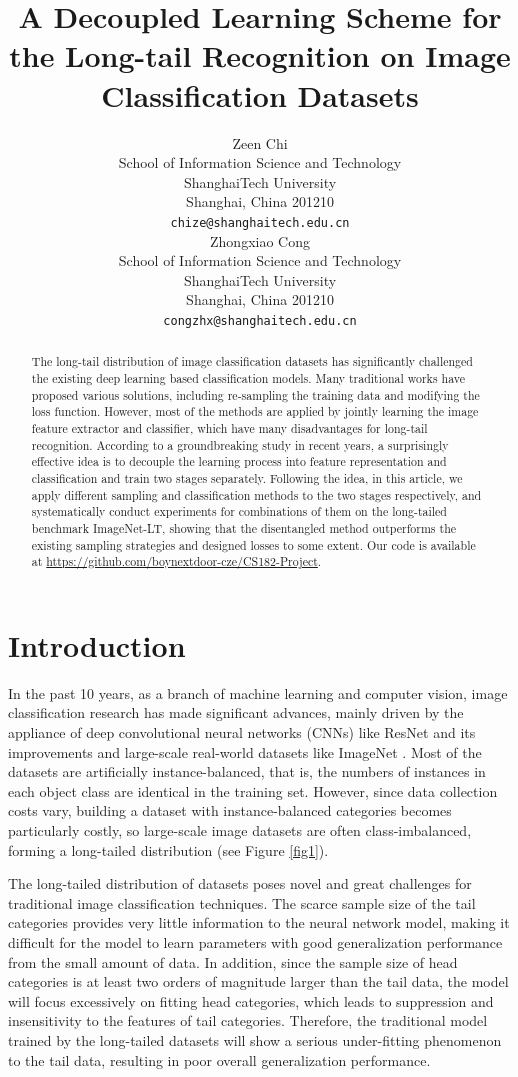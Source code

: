 \documentclass{article}
\title{A Decoupled Learning Scheme for the Long-tail Recognition on Image Classification Datasets}
\author{
  Zeen Chi \\
  School of Information Science and Technology\\
  ShanghaiTech University\\
  Shanghai, China 201210 \\
  \texttt{chize@shanghaitech.edu.cn} \\
  \And
  Zhongxiao Cong \\
  School of Information Science and Technology \\
  ShanghaiTech University\\
  Shanghai, China 201210 \\
  \texttt{congzhx@shanghaitech.edu.cn} \\
}
\begin{document}
\maketitle


\begin{abstract}
    The long-tail distribution of image classification datasets has significantly challenged the existing deep learning based classification models. Many traditional works have proposed various solutions, including re-sampling the training data and modifying the loss function. However, most of the methods are applied by jointly learning the image feature extractor and classifier, which have many disadvantages for long-tail recognition. According to a groundbreaking study in recent years, a surprisingly effective idea is to decouple the learning process into feature representation and classification and train two stages separately. Following the idea, in this article, we apply different sampling and classification methods to the two stages respectively, and systematically conduct experiments for combinations of them on the long-tailed benchmark ImageNet-LT, showing that the disentangled method outperforms the existing sampling strategies and designed losses to some extent. Our code is available at \url{https://github.com/boynextdoor-cze/CS182-Project}.
\end{abstract}


\section{Introduction}

In the past 10 years, as a branch of machine learning and computer vision, image classification research has made significant advances, mainly driven by the appliance of deep convolutional neural networks (CNNs) like ResNet and its improvements \cite{he2016deep, Xie2016} and large-scale real-world datasets like ImageNet \cite{deng2009imagenet}. Most of the datasets are artificially instance-balanced, that is, the numbers of instances in each object class are identical in the training set. However, since data collection costs vary, building a dataset with instance-balanced categories becomes particularly costly, so large-scale image datasets are often class-imbalanced, forming a long-tailed distribution (see Figure \ref{fig1}).

The long-tailed distribution of datasets poses novel and great challenges for traditional image classification techniques. The scarce sample size of the tail categories provides very little information to the neural network model, making it difficult for the model to learn parameters with good generalization performance from the small amount of data. In addition, since the sample size of head categories is at least two orders of magnitude larger than the tail data, the model will focus excessively on fitting head categories, which leads to suppression and insensitivity to the features of tail categories. Therefore, the traditional model trained by the long-tailed datasets will show a serious under-fitting phenomenon to the tail data, resulting in poor overall generalization performance.
\end{document}
